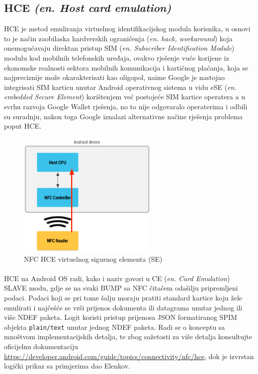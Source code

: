 \subsection{HCE \textit{(en. Host card emulation)}}
HCE je metod emuliranja virtuelnog identifikacijskog modula korisnika, u osnovi to je način zaobilaska hardverskih ograničenja (\textit{en. hack, workaround}) koja onemogućavaju direktan pristup SIM (\textit{en. Subscriber Identification Module}) modulu kod mobilnih telefonskih uređaja\cite{elenkov_2012}, ovakvo rješenje vuće korijene iz ekonomske realnosti sektora mobilnih komunikacija i kartičnog plaćanja, koja se najpreciznije može okarakterisati kao oligopol, naime Google je nastojao integrisati SIM karticu unutar Android operativnog sistema u vidu eSE (\textit{en. embedded Secure Element}) korištenjem već postojeće SIM kartice operatera a u svrhu razvoja Google Wallet rješenja, no to nije odgovaralo operaterima i odbili su suradnju, nakon toga Google iznalazi alternativne načine rješenja problema poput HCE\cite{randomoracle_2014}.

\begin{figure}[H]
    \centering
    \includegraphics[width=0.6\textwidth]{material/host-based-card}
    \caption{NFC HCE virtuelnog sigurnog elementa (SE)\cite{androidhce_2018}}
\end{figure}

\paragraph*{}
HCE na Android OS radi, kako i naziv govori u CE (\textit{en. Card Emulation}) SLAVE modu, gdje se na svaki BUMP sa NFC čitačem odašilju pripremljeni podaci. Podaci koji se pri tome šalju moraju pratiti standard kartice koju žele emulirati i najčešće se vrši prijenos dokumenta ili datagrama unutar jednog ili više NDEF paketa. Logit koristi pristup prijenosa JSON formatiranog SPIM objekta \texttt{plain/text} unutar jednog NDEF paketa. Radi se o konceptu sa mnoštvom implementacijskih detalja, te zbog sažetosti za više detalja konsultujte oficijelnu dokumentaciju \url{https://developer.android.com/guide/topics/connectivity/nfc/hce}, dok je izvrstan logički prikaz sa primjerima dao Elenkov\cite{Elenkov2015}.

